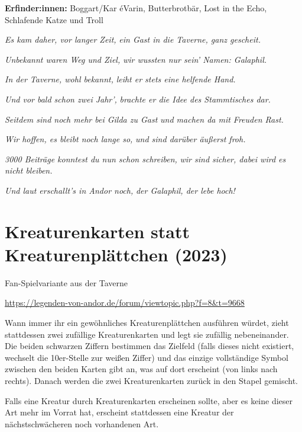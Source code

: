 {

\textbf{Erfinder:innen:} Boggart/Kar éVarin, Butterbrotbär,
Lost in the Echo, Schlafende Katze und Troll\bigskip

\textit{Es kam daher, vor langer Zeit,} \textit{ein Gast in die Taverne, ganz gescheit.}

\textit{Unbekannt waren Weg und Ziel,} \textit{wir wussten nur sein' Namen: Galaphil.}

\textit{In der Taverne, wohl bekannt,} \textit{leiht er stets eine helfende Hand.}

\textit{Und vor bald schon zwei Jahr',} \textit{brachte er die Idee des Stammtisches dar.}

\textit{Seitdem sind noch mehr bei Gilda zu Gast} \textit{und machen da mit Freuden Rast.}

\textit{Wir hoffen, es bleibt noch lange so,} \textit{und sind darüber äußerst froh.}

\textit{3000 Beiträge konntest du nun schon schreiben,} \textit{wir sind sicher, dabei wird es nicht bleiben.}

\textit{Und laut erschallt's in Andor noch,} \textit{der Galaphil, der lebe hoch!}








\newpage
\section{Kreaturenkarten statt Kreaturenplättchen (2023)}

\begin{center}
    Fan-Spielvariante aus der Taverne

    \url{https://legenden-von-andor.de/forum/viewtopic.php?f=8&t=9668}
\end{center}

 

Wann immer ihr ein gewöhnliches Kreaturenplättchen ausführen würdet, zieht stattdessen zwei zufällige Kreaturenkarten und legt sie zufällig nebeneinander. Die beiden schwarzen Ziffern bestimmen das Zielfeld (falls dieses nicht existiert, wechselt die 10er-Stelle zur weißen Ziffer) und das einzige vollständige Symbol zwischen den beiden Karten gibt an, was auf dort erscheint (von links nach rechts). Danach werden die zwei Kreaturenkarten zurück in den Stapel gemischt.

Falls eine Kreatur durch Kreaturenkarten erscheinen sollte, aber es keine dieser Art mehr im Vorrat hat, erscheint stattdessen eine Kreatur der nächstschwächeren noch vorhandenen Art.

}
